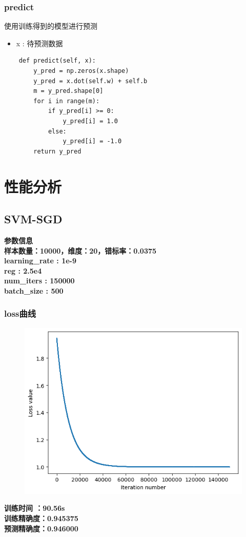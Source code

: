 \documentclass[12pt, a4paper, oneside]{ctexart}
\begin{document}
\subsubsection*{predict}
使用训练得到的模型进行预测
\begin{itemize}
    \item x : 待预测数据
\end{itemize}

\begin{lstlisting}
    def predict(self, x):
        y_pred = np.zeros(x.shape)
        y_pred = x.dot(self.w) + self.b
        m = y_pred.shape[0]
        for i in range(m):
            if y_pred[i] >= 0:
                y_pred[i] = 1.0
            else:
                y_pred[i] = -1.0
        return y_pred
\end{lstlisting}
\section*{性能分析}

\subsection*{SVM-SGD}
\textbf{参数信息}\\
\textbf{样本数量：10000，维度：20，错标率：0.0375}\\
\textbf{learning\_rate : 1e-9\\reg : 2.5e4\\ num\_iters : 150000\\ batch\_size : 500}\\

\subsubsection*{loss曲线}
\begin{figure}[H]
    \centering
    \includegraphics[scale=0.8]{sgd.png}
\end{figure}
\textbf{训练时间 ：90.56s}\\
\textbf{训练精确度：0.945375}\\
\textbf{预测精确度：0.946000}
\end{document}
